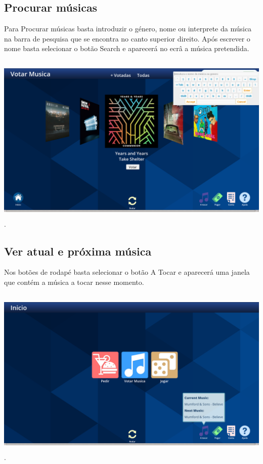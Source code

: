 \documentclass{article}
\begin{document}
\subsection{Procurar músicas}
Para Procurar músicas basta introduzir o género, nome ou interprete da música na barra de pesquisa que se encontra no canto superior direito. Após escrever o nome basta selecionar o botão Search e aparecerá no ecrâ a música pretendida.\\\\
\includegraphics[width=15cm, height=8cm]{user_manual_images/keyboard.png}.

\subsection{Ver atual e próxima música}
Nos botões de rodapé basta selecionar o botão A Tocar e aparecerá uma janela que contém a música a tocar nesse momento.\\\\
\includegraphics[width=15cm, height=8cm]{user_manual_images/current_song_ballon.png}.
\end{document}
